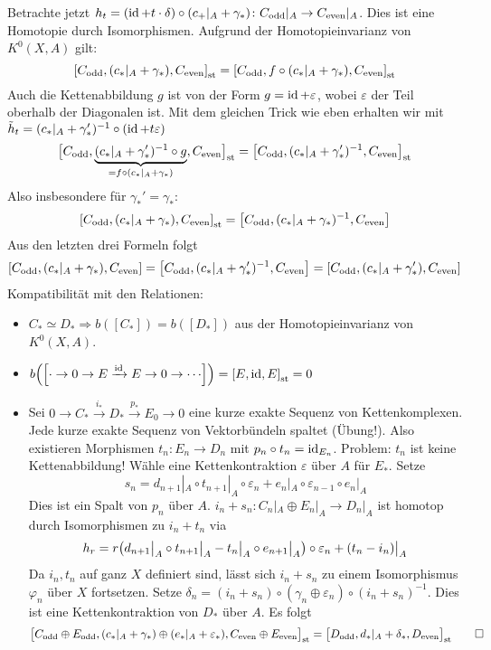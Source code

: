 \begin{beweis}
Betrachte jetzt $h_t = (\id + t \cdot \delta) \circ (c_+|_A + \gamma_*) \colon C_{\mathrm{odd}}|_A \to C_{\mathrm{even}}|_A$. Dies ist eine Homotopie durch Isomorphismen. 
Aufgrund der Homotopieinvarianz von $K^0(X,A)$ gilt:
\[
	\benbrace*{C_{\mathrm{odd}}, (c_*|_A + \gamma_*), C_\mathrm{even}}_\st  = \benbrace*{C_{\mathrm{odd}}, f \circ (c_*|_A + \gamma_*), C_\mathrm{even}}_\st
\] 
Auch die Kettenabbildung $g$ ist von der Form $g = \id + \varepsilon$, wobei $\varepsilon$ der Teil oberhalb der Diagonalen ist. Mit dem gleichen Trick wie eben erhalten wir
mit $\tilde{h}_t= (c_*|_A + \gamma_*') ^{-1} \circ (\id + t \varepsilon)$
\[
	\benbrace[\big]{C_\mathrm{odd}, \Underbrace{(c_*|_A + \gamma_*') ^{-1}\circ g}{=f \circ (c_*|_A + \gamma_*)}, C_\mathrm{even}}_\st = \benbrace*{C_\mathrm{odd}, (c_*|_A + \gamma_*') ^{-1}, C_\mathrm{even}}_\st  
\]
Also insbesondere für $\gamma_*' = \gamma_*$:
\[
	\benbrace*{C_\mathrm{odd}, (c_*|_A + \gamma_*), C_\mathrm{even}}_\st = \benbrace*{C_\mathrm{odd}, (c_*|_A + \gamma_*) ^{-1}, C_\mathrm{even}}  
\]
Aus den letzten drei Formeln folgt 
\[
	\benbrace*{C_\mathrm{odd}, (c_*|_A + \gamma_*), C_\mathrm{even}} = \benbrace*{C_\mathrm{odd}, (c_*|_A + \gamma_*')^{-1}, C_\mathrm{even}}  
	= \benbrace*{C_\mathrm{odd}, (c_*|_A + \gamma_*'), C_\mathrm{even}} 
\]
Kompatibilität mit den Relationen:
\begin{itemize}
	\item $C_* \simeq D_* \Rightarrow b([C_*]) = b([D_*])$ aus der Homotopieinvarianz von $K^0(X,A)$.
	\item $b \enbrace*{\benbrace*{\cdot \to 0 \to E \xrightarrow{\id} E \to 0 \to \cdots } } = \benbrace*{E,\id,E}_\st = 0$
	\item Sei $0 \to C_* \xrightarrow{i_*} D_* \xrightarrow{p_*} E_0 \to 0$ eine kurze exakte Sequenz von Kettenkomplexen. Jede kurze exakte Sequenz von Vektorbündeln 
	spaltet (Übung!).
	Also existieren Morphismen $t_n \colon E_n \to D_n$ mit $p_n \circ t_n = \id_{E_n}$. Problem: $t_n$ ist keine Kettenabbildung! Wähle eine Kettenkontraktion $\varepsilon$
	über $A$ für $E_*$. Setze
	\[
		s_n = d_{n+1}|_A \circ t_{n+1}|_A \circ \varepsilon_n + e_n|_A \circ \varepsilon_{n-1} \circ e_n |_A
	\]
	Dies ist ein Spalt von $p_n$ über $A$. $i_n +s_n \colon C_n|_A \oplus E_n|_A \to D_n|_A$ ist homotop durch Isomorphismen zu $i_n + t_n$ via
	\[
		h_r = r \enbrace*{d_{n+1}\big|_A \circ t_{n+1}\big|_A - t_n\big|_A \circ e_{n+1}\big|_A} \circ \varepsilon_n + (t_n - i_n) \big|_A
	\]
	Da $i_n,t_n$ auf ganz $X$ definiert sind, lässt sich $i_n+ s_n$ zu einem Isomorphismus $\varphi_n$ über $X$ fortsetzen. Setze 
	$\delta_n = (i_n +s_n) \circ (\gamma_n \oplus \varepsilon_n) \circ (i_n +s_n)^{-1}$. Dies ist eine Kettenkontraktion von $D_*$ über $A$. Es folgt
	\begin{align*}
		\benbrace[\big]{C_\mathrm{odd}\oplus E_\mathrm{odd}, (c_*|_A + \gamma_*) \oplus (e_*|_A + \varepsilon_*), C_\mathrm{even} \oplus E_{\mathrm{even}}}_\st
		= \benbrace[\big]{D_\mathrm{odd}, d_*|_A + \delta_*, D_\mathrm{even}}_\st \qedhere  
	\end{align*}
\end{itemize}	
\end{beweis}


